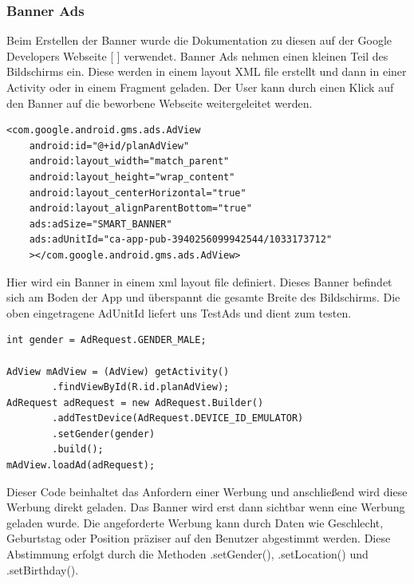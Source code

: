\documentclass[FIPLY_base.tex]{subfiles}
\begin{document}
\subsubsection{Banner Ads}
Beim Erstellen der Banner wurde die Dokumentation zu diesen auf der Google Developers Webseite [ \cite{gdBanner}] verwendet. \newline 
Banner Ads nehmen einen kleinen Teil des Bildschirms ein. Diese werden in einem layout XML file erstellt und dann in einer Activity oder in einem Fragment geladen. Der User kann durch einen Klick auf den Banner auf die beworbene Webseite weitergeleitet werden.
\ \\
\begin{lstlisting}
<com.google.android.gms.ads.AdView
    android:id="@+id/planAdView"
    android:layout_width="match_parent"
    android:layout_height="wrap_content"
    android:layout_centerHorizontal="true"
    android:layout_alignParentBottom="true"
    ads:adSize="SMART_BANNER"
    ads:adUnitId="ca-app-pub-3940256099942544/1033173712"
    ></com.google.android.gms.ads.AdView>
\end{lstlisting}
Hier wird ein Banner in einem xml layout file definiert. Dieses Banner befindet sich am Boden der App und überspannt die gesamte Breite des Bildschirms.
Die oben eingetragene AdUnitId liefert uns TestAds und dient zum testen.
\ \\
\begin{lstlisting}
int gender = AdRequest.GENDER_MALE;

AdView mAdView = (AdView) getActivity()
        .findViewById(R.id.planAdView);
AdRequest adRequest = new AdRequest.Builder()
        .addTestDevice(AdRequest.DEVICE_ID_EMULATOR)
        .setGender(gender)
        .build();
mAdView.loadAd(adRequest);
\end{lstlisting}
Dieser Code beinhaltet das Anfordern einer Werbung und anschließend wird diese Werbung direkt geladen.
Das Banner wird erst dann sichtbar wenn eine Werbung geladen wurde.
Die angeforderte Werbung kann durch Daten wie Geschlecht, Geburtstag oder Position präziser auf den Benutzer abgestimmt werden.
Diese Abstimmung erfolgt durch die Methoden .setGender(), .setLocation() und .setBirthday().	

\newpage
\end{document}
